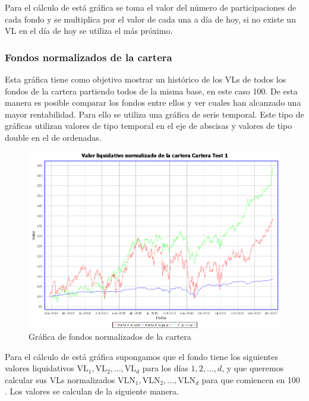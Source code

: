 \documentclass[12pt, a4paper]{article}
\begin{document}
Para el cálculo de está gráfica se toma el valor del número de participaciones de cada fondo y se multiplica por el valor de cada una a día de hoy, si no existe un \gls{VL} en el día de hoy se utiliza el más próximo.\\
\newpage

\subsubsection{Fondos normalizados de la cartera}

Esta gráfica tiene como objetivo mostrar un histórico de los \gls{VL}s de todos los fondos de la cartera partiendo todos de la misma base, en este caso 100. De esta manera es posible comparar los fondos entre ellos y ver cuales han alcanzado una mayor rentabilidad. Para ello se utiliza una gráfica de serie temporal. Este tipo de gráficas utilizan valores de tipo temporal en el eje de abscisas y valores de tipo double en el de ordenadas.\\

	\begin{figure}[htbp]
	\centering
	\includegraphics[width=\textwidth]{figuras/normalizados.PNG}
	\caption{Gráfica de fondos normalizados de la cartera}
	\label{fig:normalizados}
	\end {figure}
	
	


Para el cálculo de está gráfica supongamos que el fondo tiene los siguientes valores liquidativos $\text{VL}_1,\text{VL}_2,\ldots,\text{VL}_d$ para los días $1,2,\ldots,d$, y que queremos calcular sus \gls{VL}s normalizados $\text{VLN}_1,\text{VLN}_2,\ldots,\text{VLN}_d$ para que comiencen en 100 . Los valores se calculan de la siguiente manera.
\end{document}
